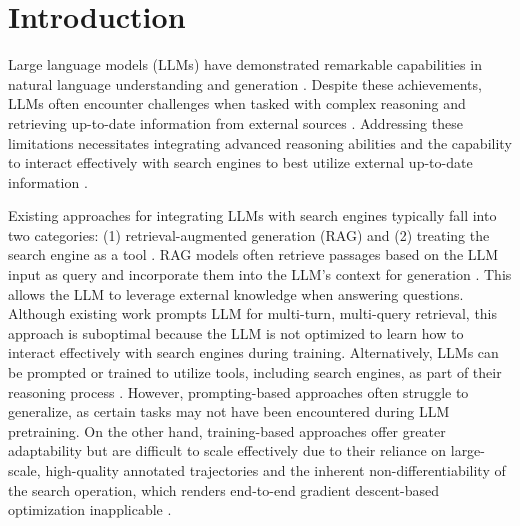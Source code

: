 
\section{Introduction}

Large language models (LLMs) have demonstrated remarkable capabilities in natural language understanding and generation \citep{hendrycks2020measuring,clark2018think}.
Despite these achievements, LLMs often encounter challenges when tasked with complex reasoning \citep{wei2022chain} and retrieving up-to-date information from external sources \citep{jin2024long}. Addressing these limitations necessitates integrating advanced reasoning abilities \citep{huang2022towards} and the capability to interact effectively with search engines to best utilize external up-to-date information \citep{schick2023toolformer}.

Existing approaches for integrating LLMs with search engines typically fall into two categories: (1) retrieval-augmented generation (RAG) \citep{gao2023retrieval, lewis2020retrieval} and (2) treating the search engine as a tool \citep{yao2023react, schick2023toolformer}. 
RAG models often retrieve passages based on the LLM input as query and incorporate them into the LLM’s context for generation \citep{lewis2020retrieval}. 
This allows the LLM to leverage external knowledge when answering questions. 
Although existing work \citep{trivedi2022interleaving} prompts LLM for multi-turn, multi-query retrieval, this approach is suboptimal because the LLM is not optimized to learn how to interact effectively with search engines during training.
Alternatively, LLMs can be prompted or trained to utilize tools, including search engines, as part of their reasoning process \citep{qu2025tool, trivedi2022interleaving}. 
However, prompting-based approaches often struggle to generalize, as certain tasks may not have been encountered during LLM pretraining. 
On the other hand, training-based approaches offer greater adaptability but are difficult to scale effectively due to their reliance on large-scale, high-quality annotated trajectories and the inherent non-differentiability of the search operation, which renders end-to-end gradient descent-based optimization inapplicable \citep{schick2023toolformer,asai2024self}.

